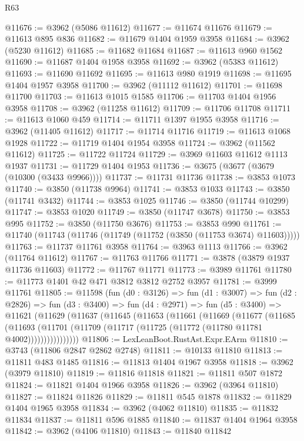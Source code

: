\begin{lexlean}{R63}
\begin{coremodule}
@11676 := @3962 (@5086 @11612)
@11677 := @11674 @11676
@11679 := @11613 @895 @836
@11682 := @11679 @1404 @1959 @3958
@11684 := @3962 (@5230 @11612)
@11685 := @11682 @11684
@11687 := @11613 @960 @1562
@11690 := @11687 @1404 @1958 @3958
@11692 := @3962 (@5383 @11612)
@11693 := @11690 @11692
@11695 := @11613 @980 @1919
@11698 := @11695 @1404 @1957 @3958
@11700 := @3962 (@11112 @11612)
@11701 := @11698 @11700
@11703 := @11613 @1015 @1585
@11706 := @11703 @1404 @1956 @3958
@11708 := @3962 (@11258 @11612)
@11709 := @11706 @11708
@11711 := @11613 @1060 @459
@11714 := @11711 @1397 @1955 @3958
@11716 := @3962 (@11405 @11612)
@11717 := @11714 @11716
@11719 := @11613 @1068 @1928
@11722 := @11719 @1404 @1954 @3958
@11724 := @3962 (@11562 @11612)
@11725 := @11722 @11724
@11729 := @3969 @11603 @11612 @1113 @1937
@11731 := @11729 @1404 @1953
@11736 := @3675 (@3677 (@3679 (@10300 (@3433 @9966))))
@11737 := @11731 @11736
@11738 := @3853 @1073
@11740 := @3850 (@11738 @9964)
@11741 := @3853 @1033
@11743 := @3850 (@11741 @3432)
@11744 := @3853 @1025
@11746 := @3850 (@11744 @10299)
@11747 := @3853 @1020
@11749 := @3850 (@11747 @3678)
@11750 := @3853 @995
@11752 := @3850 (@11750 @3676)
@11753 := @3853 @990
@11761 := @11740 (@11743 (@11746 (@11749 (@11752 (@3850 (@11753 @3674) @11603)))))
@11763 := @11737 @11761 @3958
@11764 := @3963 @1113
@11766 := @3962 (@11764 @11612)
@11767 := @11763 @11766
@11771 := @3878 (@3879 @1937 @11736 @11603)
@11772 := @11767 @11771
@11773 := @3989 @11761
@11780 := @11773 @1401 @42 @471 @3812 @3812 @2752 @3957
@11781 := @3999 @11761
@11805 := @11598
    (fun (d0 : @3126) =>
    fun (d1 : @3007) =>
    fun (d2 : @2826) =>
    fun (d3 : @3400) =>
    fun (d4 : @2971) =>
    fun (d5 : @3400) =>
    @11621
      (@11629
        (@11637
          (@11645
            (@11653
              (@11661
                (@11669
                  (@11677
                    (@11685
                      (@11693
                        (@11701 (@11709 (@11717 (@11725 (@11772 (@11780 @11781 @4002))))))))))))))))
@11806 := LexLeanBoot.RustAst.Expr.EArm
@11810 := @3743 (@11806 @2847 @2862 @2748)
@11811 := @10133 @11810
@11813 := @11811 @483 @1485
@11816 := @11813 @1404 @1967 @3958
@11818 := @3962 (@3979 @11810)
@11819 := @11816 @11818
@11821 := @11811 @507 @1872
@11824 := @11821 @1404 @1966 @3958
@11826 := @3962 (@3964 @11810)
@11827 := @11824 @11826
@11829 := @11811 @545 @1878
@11832 := @11829 @1404 @1965 @3958
@11834 := @3962 (@4062 @11810)
@11835 := @11832 @11834
@11837 := @11811 @596 @1885
@11840 := @11837 @1404 @1964 @3958
@11842 := @3962 (@4106 @11810)
@11843 := @11840 @11842

\end{coremodule}
\end{lexlean}
